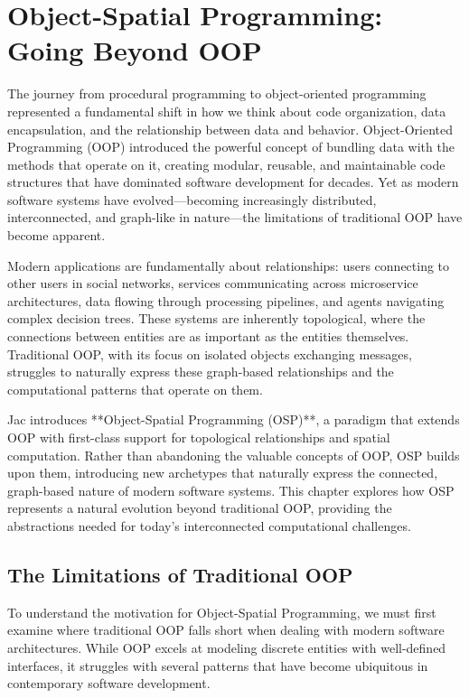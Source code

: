 \mtcaddchapter
\chapter{Object-Spatial Programming: Going Beyond OOP}
\minitoc

The journey from procedural programming to object-oriented programming represented a fundamental shift in how we think about code organization, data encapsulation, and the relationship between data and behavior. Object-Oriented Programming (OOP) introduced the powerful concept of bundling data with the methods that operate on it, creating modular, reusable, and maintainable code structures that have dominated software development for decades. Yet as modern software systems have evolved—becoming increasingly distributed, interconnected, and graph-like in nature—the limitations of traditional OOP have become apparent.

Modern applications are fundamentally about relationships: users connecting to other users in social networks, services communicating across microservice architectures, data flowing through processing pipelines, and agents navigating complex decision trees. These systems are inherently topological, where the connections between entities are as important as the entities themselves. Traditional OOP, with its focus on isolated objects exchanging messages, struggles to naturally express these graph-based relationships and the computational patterns that operate on them.

Jac introduces **Object-Spatial Programming (OSP)**, a paradigm that extends OOP with first-class support for topological relationships and spatial computation. Rather than abandoning the valuable concepts of OOP, OSP builds upon them, introducing new archetypes that naturally express the connected, graph-based nature of modern software systems. This chapter explores how OSP represents a natural evolution beyond traditional OOP, providing the abstractions needed for today's interconnected computational challenges.

\section{The Limitations of Traditional OOP}

To understand the motivation for Object-Spatial Programming, we must first examine where traditional OOP falls short when dealing with modern software architectures. While OOP excels at modeling discrete entities with well-defined interfaces, it struggles with several patterns that have become ubiquitous in contemporary software development.

